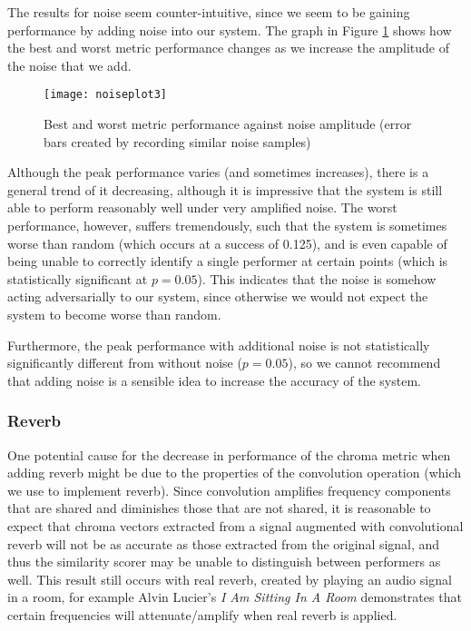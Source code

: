 \documentclass[oneside, class=book, 12pt, crop=false]{standalone}
\begin{document}
The results for noise seem counter-intuitive, since we seem to be gaining performance by adding noise into our system. The graph in Figure \ref{fig:noiseplot} shows how the best and worst metric performance changes as we increase the amplitude of the noise that we add.

\begin{figure}[h]
    \captionsetup{justification=centering}
    \centering
    \texttt{[image: noiseplot3]}
    \caption{Best and worst metric performance against noise amplitude (error bars created by recording similar noise samples)}
    \label{fig:noiseplot}
\end{figure}

Although the peak performance varies (and sometimes increases), there is a general trend of it decreasing, although it is impressive that the system is still able to perform reasonably well under very amplified noise. The worst performance, however, suffers tremendously, such that the system is sometimes worse than random (which occurs at a success of 0.125), and is even capable of being unable to correctly identify a single performer at certain points (which is statistically significant at $p=0.05$). This indicates that the noise is somehow acting adversarially to our system, since otherwise we would not expect the system to become worse than random.

Furthermore, the peak performance with additional noise is not statistically significantly different from without noise ($p=0.05$), so we cannot recommend that adding noise is a sensible idea to increase the accuracy of the system.

\subsubsection{Reverb}\label{sec:reverb issues}

One potential cause for the decrease in performance of the chroma metric when adding reverb might be due to the properties of the convolution operation (which we use to implement reverb). Since convolution amplifies frequency components that are shared and diminishes those that are not shared, it is reasonable to expect that chroma vectors extracted from a signal augmented with convolutional reverb will not be as accurate as those extracted from the original signal, and thus the similarity scorer may be unable to distinguish between performers as well. This result still occurs with real reverb, created by playing an audio signal in a room, for example Alvin Lucier's \textit{I Am Sitting In A Room}\cite{alvinlucier}  demonstrates that certain frequencies will attenuate/amplify when real reverb is applied.
\end{document}
